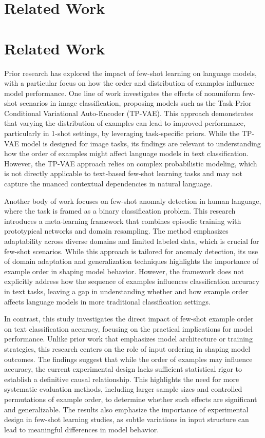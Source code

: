 \documentclass{article}
\begin{document}
\section{Related Work}
\section*{Related Work}

Prior research has explored the impact of few-shot learning on language models, with a particular focus on how the order and distribution of examples influence model performance. One line of work investigates the effects of nonuniform few-shot scenarios in image classification, proposing models such as the Task-Prior Conditional Variational Auto-Encoder (TP-VAE). This approach demonstrates that varying the distribution of examples can lead to improved performance, particularly in 1-shot settings, by leveraging task-specific priors. While the TP-VAE model is designed for image tasks, its findings are relevant to understanding how the order of examples might affect language models in text classification. However, the TP-VAE approach relies on complex probabilistic modeling, which is not directly applicable to text-based few-shot learning tasks and may not capture the nuanced contextual dependencies in natural language.

Another body of work focuses on few-shot anomaly detection in human language, where the task is framed as a binary classification problem. This research introduces a meta-learning framework that combines episodic training with prototypical networks and domain resampling. The method emphasizes adaptability across diverse domains and limited labeled data, which is crucial for few-shot scenarios. While this approach is tailored for anomaly detection, its use of domain adaptation and generalization techniques highlights the importance of example order in shaping model behavior. However, the framework does not explicitly address how the sequence of examples influences classification accuracy in text tasks, leaving a gap in understanding whether and how example order affects language models in more traditional classification settings.

In contrast, this study investigates the direct impact of few-shot example order on text classification accuracy, focusing on the practical implications for model performance. Unlike prior work that emphasizes model architecture or training strategies, this research centers on the role of input ordering in shaping model outcomes. The findings suggest that while the order of examples may influence accuracy, the current experimental design lacks sufficient statistical rigor to establish a definitive causal relationship. This highlights the need for more systematic evaluation methods, including larger sample sizes and controlled permutations of example order, to determine whether such effects are significant and generalizable. The results also emphasize the importance of experimental design in few-shot learning studies, as subtle variations in input structure can lead to meaningful differences in model behavior.
\end{document}

